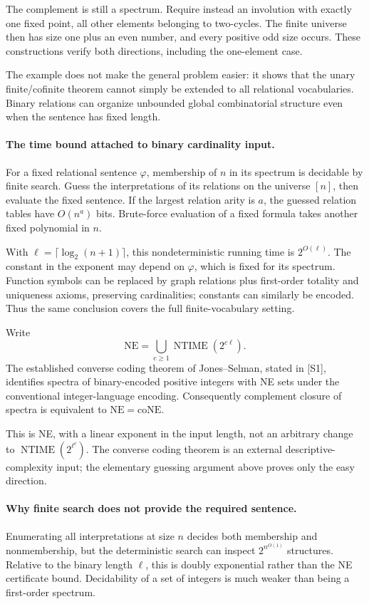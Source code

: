 \documentclass[11pt]{article}
\begin{document}
The complement is still a spectrum. Require instead an involution with exactly one fixed point, all other elements belonging to two-cycles. The finite universe then has size one plus an even number, and every positive odd size occurs. These constructions verify both directions, including the one-element case.

The example does not make the general problem easier: it shows that the unary finite/cofinite theorem cannot simply be extended to all relational vocabularies. Binary relations can organize unbounded global combinatorial structure even when the sentence has fixed length.

\paragraph{The time bound attached to binary cardinality input.}
For a fixed relational sentence $\varphi$, membership of $n$ in its spectrum is decidable by finite search. Guess the interpretations of its relations on the universe $[n]$, then evaluate the fixed sentence. If the largest relation arity is $a$, the guessed relation tables have $O(n^a)$ bits. Brute-force evaluation of a fixed formula takes another fixed polynomial in $n$.

With $\ell=\lceil\log_2(n+1)\rceil$, this nondeterministic running time is
$2^{O(\ell)}$. The constant in the exponent may depend on $\varphi$, which is fixed for its spectrum. Function symbols can be replaced by graph relations plus first-order totality and uniqueness axioms, preserving cardinalities; constants can similarly be encoded. Thus the same conclusion covers the full finite-vocabulary setting.

Write
\[
 \mathrm{NE}=\bigcup_{c\ge1}\operatorname{NTIME}(2^{c\ell}).
\]
The established converse coding theorem of Jones--Selman, stated in [S1], identifies spectra of binary-encoded positive integers with NE sets under the conventional integer-language encoding. Consequently complement closure of spectra is equivalent to $\mathrm{NE}=\mathrm{coNE}$.

This is NE, with a linear exponent in the input length, not an arbitrary change to $\operatorname{NTIME}(2^{\ell^c})$. The converse coding theorem is an external descriptive-complexity input; the elementary guessing argument above proves only the easy direction.

\paragraph{Why finite search does not provide the required sentence.}
Enumerating all interpretations at size $n$ decides both membership and nonmembership, but the deterministic search can inspect $2^{n^{O(1)}}$ structures. Relative to the binary length $\ell$, this is doubly exponential rather than the NE certificate bound. Decidability of a set of integers is much weaker than being a first-order spectrum.
\end{document}
